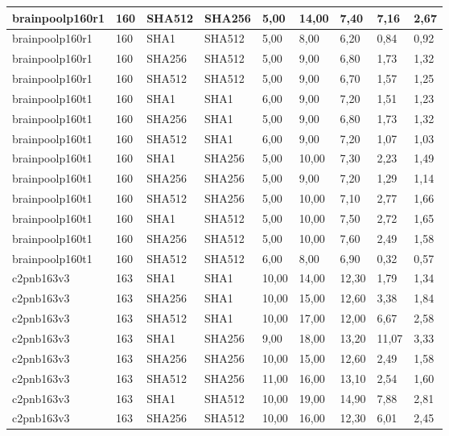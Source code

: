 \begin{longtable}{| l | l | l | l | l |l |l |l |l |}
brainpoolp160r1 & 160 & SHA512 & SHA256 & 5,00 & 14,00 & 7,40 & 7,16 & 2,67 \\ \hline 
brainpoolp160r1 & 160 & SHA1 & SHA512 & 5,00 & 8,00 & 6,20 & 0,84 & 0,92 \\ \hline 
brainpoolp160r1 & 160 & SHA256 & SHA512 & 5,00 & 9,00 & 6,80 & 1,73 & 1,32 \\ \hline 
brainpoolp160r1 & 160 & SHA512 & SHA512 & 5,00 & 9,00 & 6,70 & 1,57 & 1,25 \\ \hline 
brainpoolp160t1 & 160 & SHA1 & SHA1 & 6,00 & 9,00 & 7,20 & 1,51 & 1,23 \\ \hline 
brainpoolp160t1 & 160 & SHA256 & SHA1 & 5,00 & 9,00 & 6,80 & 1,73 & 1,32 \\ \hline 
brainpoolp160t1 & 160 & SHA512 & SHA1 & 6,00 & 9,00 & 7,20 & 1,07 & 1,03 \\ \hline 
brainpoolp160t1 & 160 & SHA1 & SHA256 & 5,00 & 10,00 & 7,30 & 2,23 & 1,49 \\ \hline 
brainpoolp160t1 & 160 & SHA256 & SHA256 & 5,00 & 9,00 & 7,20 & 1,29 & 1,14 \\ \hline 
brainpoolp160t1 & 160 & SHA512 & SHA256 & 5,00 & 10,00 & 7,10 & 2,77 & 1,66 \\ \hline 
brainpoolp160t1 & 160 & SHA1 & SHA512 & 5,00 & 10,00 & 7,50 & 2,72 & 1,65 \\ \hline 
brainpoolp160t1 & 160 & SHA256 & SHA512 & 5,00 & 10,00 & 7,60 & 2,49 & 1,58 \\ \hline 
brainpoolp160t1 & 160 & SHA512 & SHA512 & 6,00 & 8,00 & 6,90 & 0,32 & 0,57 \\ \hline 
c2pnb163v3 & 163 & SHA1 & SHA1 & 10,00 & 14,00 & 12,30 & 1,79 & 1,34 \\ \hline 
c2pnb163v3 & 163 & SHA256 & SHA1 & 10,00 & 15,00 & 12,60 & 3,38 & 1,84 \\ \hline 
c2pnb163v3 & 163 & SHA512 & SHA1 & 10,00 & 17,00 & 12,00 & 6,67 & 2,58 \\ \hline 
c2pnb163v3 & 163 & SHA1 & SHA256 & 9,00 & 18,00 & 13,20 & 11,07 & 3,33 \\ \hline 
c2pnb163v3 & 163 & SHA256 & SHA256 & 10,00 & 15,00 & 12,60 & 2,49 & 1,58 \\ \hline 
c2pnb163v3 & 163 & SHA512 & SHA256 & 11,00 & 16,00 & 13,10 & 2,54 & 1,60 \\ \hline 
c2pnb163v3 & 163 & SHA1 & SHA512 & 10,00 & 19,00 & 14,90 & 7,88 & 2,81 \\ \hline 
c2pnb163v3 & 163 & SHA256 & SHA512 & 10,00 & 16,00 & 12,30 & 6,01 & 2,45 \\ \hline 

\end{longtable}
